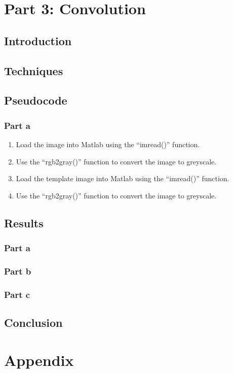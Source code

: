 \documentclass[a4paper]{article}
\begin{document}
	\section{Part 3: Convolution}
	\subsection{Introduction}
	\subsection{Techniques}
	\subsection{Pseudocode}
	\subsubsection{Part a}
	\begin{enumerate}
		\item Load the image into Matlab using the ``imread()''
			function.
		\item Use the ``rgb2gray()'' function to convert the image to
			greyscale.
		\item Load the template image into Matlab using the ``imread()''
			function.
		\item Use the ``rgb2gray()'' function to convert the image to
			greyscale.
	\end{enumerate}
	\subsection{Results}
	\subsubsection{Part a}
	\subsubsection{Part b}
	\subsubsection{Part c}
	\subsection{Conclusion}
	\section{Appendix}
\end{document}
